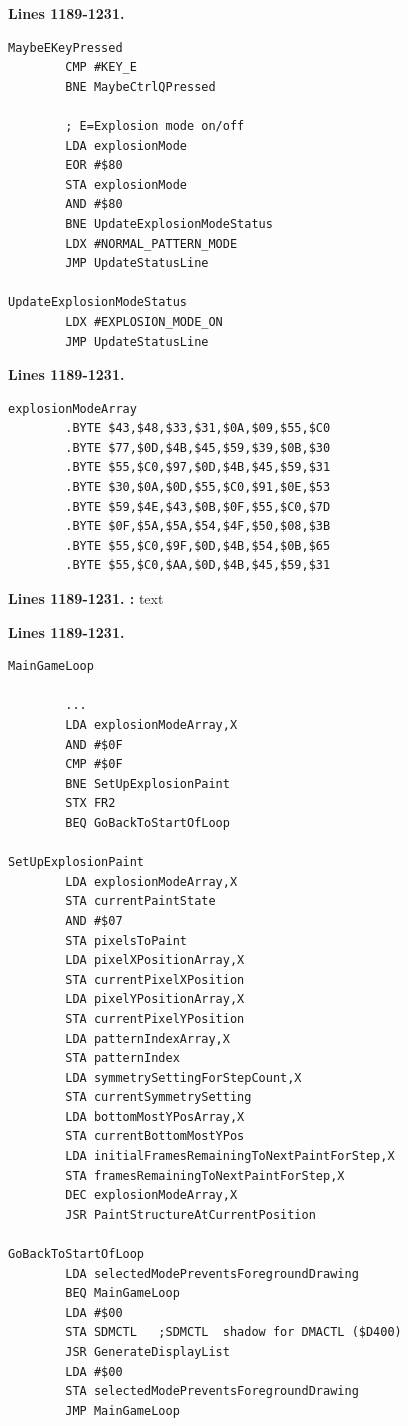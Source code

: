 \textbf{Lines 1189-1231. } 
\begin{lstlisting}
MaybeEKeyPressed   
        CMP #KEY_E
        BNE MaybeCtrlQPressed

        ; E=Explosion mode on/off 
        LDA explosionMode
        EOR #$80
        STA explosionMode
        AND #$80
        BNE UpdateExplosionModeStatus
        LDX #NORMAL_PATTERN_MODE
        JMP UpdateStatusLine

UpdateExplosionModeStatus   
        LDX #EXPLOSION_MODE_ON
        JMP UpdateStatusLine

\end{lstlisting}
\textbf{Lines 1189-1231. } 
\begin{lstlisting}
explosionModeArray   
        .BYTE $43,$48,$33,$31,$0A,$09,$55,$C0
        .BYTE $77,$0D,$4B,$45,$59,$39,$0B,$30
        .BYTE $55,$C0,$97,$0D,$4B,$45,$59,$31
        .BYTE $30,$0A,$0D,$55,$C0,$91,$0E,$53
        .BYTE $59,$4E,$43,$0B,$0F,$55,$C0,$7D
        .BYTE $0F,$5A,$5A,$54,$4F,$50,$08,$3B
        .BYTE $55,$C0,$9F,$0D,$4B,$54,$0B,$65
        .BYTE $55,$C0,$AA,$0D,$4B,$45,$59,$31
\end{lstlisting}

\clearpage

\textbf{Lines 1189-1231. :} 
text
\clearpage

\textbf{Lines 1189-1231. } 
\begin{lstlisting}
MainGameLoop

        ...
        LDA explosionModeArray,X
        AND #$0F
        CMP #$0F
        BNE SetUpExplosionPaint
        STX FR2
        BEQ GoBackToStartOfLoop

SetUpExplosionPaint   
        LDA explosionModeArray,X
        STA currentPaintState
        AND #$07
        STA pixelsToPaint
        LDA pixelXPositionArray,X
        STA currentPixelXPosition
        LDA pixelYPositionArray,X
        STA currentPixelYPosition
        LDA patternIndexArray,X
        STA patternIndex
        LDA symmetrySettingForStepCount,X
        STA currentSymmetrySetting
        LDA bottomMostYPosArray,X
        STA currentBottomMostYPos
        LDA initialFramesRemainingToNextPaintForStep,X
        STA framesRemainingToNextPaintForStep,X
        DEC explosionModeArray,X
        JSR PaintStructureAtCurrentPosition

GoBackToStartOfLoop
        LDA selectedModePreventsForegroundDrawing
        BEQ MainGameLoop
        LDA #$00
        STA SDMCTL   ;SDMCTL  shadow for DMACTL ($D400)
        JSR GenerateDisplayList
        LDA #$00
        STA selectedModePreventsForegroundDrawing
        JMP MainGameLoop
\end{lstlisting}

